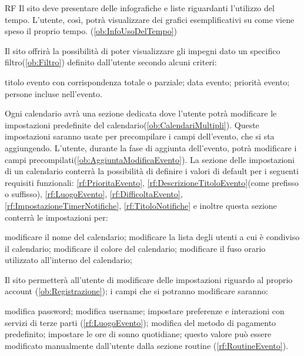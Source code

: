 \begin{listaPersonale}{RF}
	 Il sito deve presentare delle infografiche e liste riguardanti l'utilizzo del tempo. L'utente, così, potrà visualizzare dei grafici esemplificativi su come viene speso il proprio tempo. (\ref{ob:InfoUsoDelTempo})

	 Il sito offrirà la possibilità di poter visualizzare gli impegni dato un specifico filtro(\ref{ob:Filtro}) definito dall'utente secondo alcuni criteri:
\begin{listaPersonale2}[RF]{}
		 titolo evento con corrispondenza totale o parziale;
		 data evento;
		 priorità evento;
		 persone incluse nell'evento.
	\end{listaPersonale2}

 Ogni calendario avrà una sezione dedicata dove l'utente potrà modificare le impostazioni predefinite del calendario(\ref{ob:CalendariMultipli}). Queste impostazioni saranno usate per precompilare i campi dell'evento, che si sta aggiungendo. L'utente, durante la fase di aggiunta dell'evento, potrà modificare i campi precompilati(\ref{ob:AggiuntaModificaEvento}). La sezione delle impostazioni di un calendario conterrà la possibilità di definire i valori di default per i seguenti requisiti funzionali: \ref{rf:PrioritaEvento}, \ref{rf:DescrizioneTitoloEvento}(come prefisso o suffisso), \ref{rf:LuogoEvento}, \ref{rf:DifficoltaEvento}, \ref{rf:ImpostazioneTimerNotifiche}, \ref{rf:TitoloNotifiche} e inoltre questa sezione conterrà le impostazioni per:
\begin{listaPersonale2}[RF]{}
		 modificare il nome del calendario;
		 modificare la lista degli utenti a cui è condiviso il calendario;
		 modificare il colore del calendario;
		 modificare il fuso orario utilizzato all'interno del calendario;

	\end{listaPersonale2}

	 Il sito permetterà all'utente di modificare delle impostazioni riguardo al proprio account (\ref{ob:Registrazione}); i campi che si potranno modificare saranno:
\begin{listaPersonale2}[RF]{}
		 modifica password;
		 modifica username;
 impostare preferenze e interazioni con servizi di terze parti (\ref{rf:LuogoEvento});
		 modifica del metodo di pagamento predefinito;
		 impostare le ore di sonno quotidiane; questo valore può essere modificato manualmente dall'utente dalla sezione routine (\ref{rf:RoutineEvento}).
	\end{listaPersonale2}


\end{listaPersonale}
